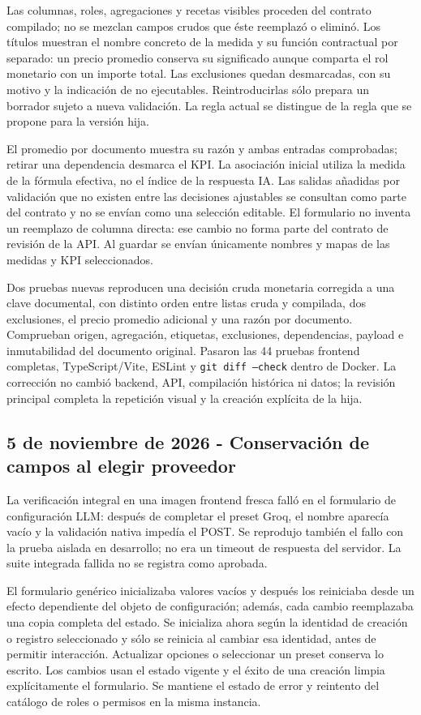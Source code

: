 \documentclass[11pt,letterpaper]{article}
\newcommand{\file}[1]{\texttt{#1}}
\begin{document}
Las columnas, roles, agregaciones y recetas visibles proceden del contrato
compilado; no se mezclan campos crudos que éste reemplazó o eliminó.
Los títulos muestran el nombre concreto de la medida y su función contractual
por separado: un precio promedio conserva su significado aunque comparta
el rol monetario con un importe total. Las exclusiones quedan desmarcadas,
con su motivo y la indicación de no ejecutables. Reintroducirlas sólo prepara
un borrador sujeto a nueva validación. La regla actual se distingue de la
regla que se propone para la versión hija.

El promedio por documento muestra su razón y ambas entradas comprobadas;
retirar una dependencia desmarca el KPI. La asociación inicial utiliza la
medida de la fórmula efectiva, no el índice de la respuesta IA. Las salidas
añadidas por validación que no existen entre las decisiones ajustables se
consultan como parte del contrato y no se envían como una selección editable.
El formulario no inventa un reemplazo de columna directa: ese cambio no forma
parte del contrato de revisión de la API. Al guardar se envían únicamente
nombres y mapas de las medidas y KPI seleccionados.

Dos pruebas nuevas reproducen una decisión cruda monetaria corregida a una
clave documental, con distinto orden entre listas cruda y compilada, dos
exclusiones, el precio promedio adicional y una razón por documento. Comprueban
origen, agregación, etiquetas, exclusiones, dependencias, payload e inmutabilidad
del documento original. Pasaron las 44 pruebas frontend completas,
TypeScript/Vite, ESLint y \file{git diff --check} dentro de Docker. La corrección
no cambió backend, API, compilación histórica ni datos; la revisión principal
completa la repetición visual y la creación explícita de la hija.

\subsection{5 de noviembre de 2026 - Conservación de campos al elegir proveedor}

La verificación integral en una imagen frontend fresca falló en el formulario
de configuración LLM: después de completar el preset Groq, el nombre aparecía
vacío y la validación nativa impedía el POST. Se reprodujo también el fallo
con la prueba aislada en desarrollo; no era un timeout de respuesta del
servidor. La suite integrada fallida no se registra como aprobada.

El formulario genérico inicializaba valores vacíos y después los reiniciaba
desde un efecto dependiente del objeto de configuración; además, cada cambio
reemplazaba una copia completa del estado. Se inicializa ahora según la
identidad de creación o registro seleccionado y sólo se reinicia al cambiar
esa identidad, antes de permitir interacción. Actualizar opciones o seleccionar
un preset conserva lo escrito. Los cambios usan el estado vigente y el éxito
de una creación limpia explícitamente el formulario. Se mantiene el estado de
error y reintento del catálogo de roles o permisos en la misma instancia.
\end{document}
